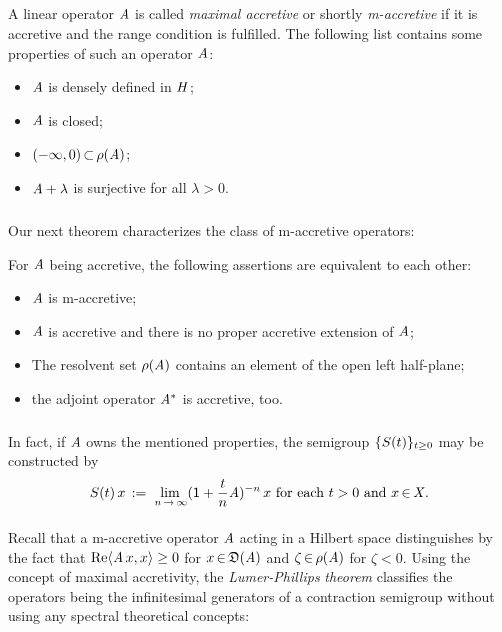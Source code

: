 \documentclass[11pt,twoside]{article}
\begin{document}
\subparagraph*{}
A linear operator $\mathit{A}$ is called \textit{maximal accretive}
or shortly \textit{m-accretive}
if it is accretive and the range condition is fulfilled.
The following list contains some properties of such an operator $\mathit{A}$:

\begin{itemize}[leftmargin=12pt]
\item[1.] $\mathit{A}$ is densely defined in $\mathit{H}$;
\item[2.] $\mathit{A}$ is closed;
\item[3.] $(-\infty,0) {\,\subset\,} \rho(\mathit{A})$;
\item[4.] $\mathit{A} + \lambda$ is surjective for all $\lambda > 0$.
\end{itemize}

\subparagraph*{} %
Our next theorem characterizes the class of m-accretive operators:

\begin{theorem}
For $\mathit{A}$ being accretive,
the following assertions are equivalent to each other:

\begin{itemize}[leftmargin=12pt]
\item[1.]
$\mathit{A}$ is m-accretive;
\item[2.]
$\mathit{A}$ is accretive and there is no proper accretive extension of $\mathit{A}$;
\item[3.]
The resolvent set $\rho(\mathit{A})$ contains an element of the open left half-plane;
\item[4.]
the adjoint operator $\mathit{A}^*$ is accretive, too.
\end{itemize}
\end{theorem}

\subparagraph*{}
In fact,
if $\mathit{A}$ owns the mentioned properties,
the semigroup $\{{S}(t)\}_{t \geq 0}$ may be constructed by
\begin{equation}\label{YOSIDA_APPROXIMATION}
{S}(t) \, x \,:=\, \lim_{\,n {\,\to\,} \infty} ({\mathsf{1}} + \frac{t}{n} \mathit{A})^{-n} \,x 
\mbox{ for each } t > 0 \mbox{ and } x {\,\in\,} \mathit{X}.
\end{equation}

\paragraph*{} %
Recall that a m-accretive operator $\mathit{A}$ acting in a Hilbert space
distinguishes by the fact
that $\operatorname{Re} \langle \mathit{A} \,x,x \rangle \geq 0$ for $x {\,\in\,} \mathfrak{D}(\mathit{A})$
and $\zeta {\,\in\,} \rho(\mathit{A})$ for $\zeta < 0$.
Using the concept of maximal accretivity,
the \textit{Lumer-Phillips} \textit{theorem} classifies the operators
being the infinitesimal generators of a contraction semigroup
without using any spectral theoretical concepts:
\end{document}
